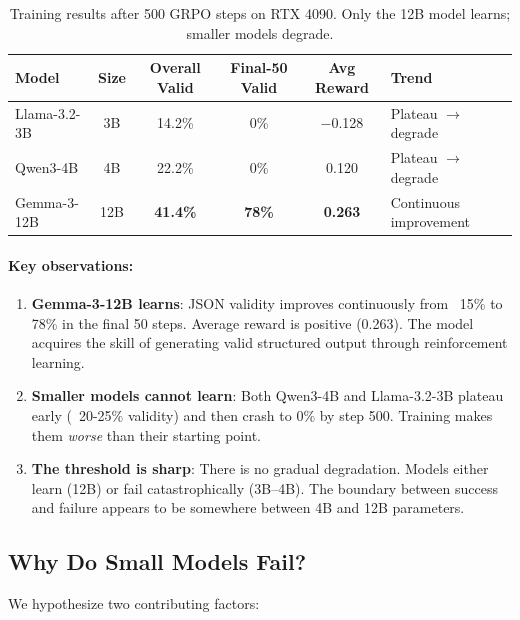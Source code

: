 \documentclass[11pt]{article}
\begin{document}
\begin{table}[t]
\centering
\caption{Training results after 500 GRPO steps on RTX 4090. Only the 12B model learns; smaller models degrade.}
\label{tab:training-results}
\begin{tabular}{lccccl}
\toprule
\textbf{Model} & \textbf{Size} & \textbf{Overall Valid} & \textbf{Final-50 Valid} & \textbf{Avg Reward} & \textbf{Trend} \\
\midrule
Llama-3.2-3B & 3B & 14.2\% & 0\% & $-$0.128 & Plateau $\rightarrow$ degrade \\
Qwen3-4B & 4B & 22.2\% & 0\% & 0.120 & Plateau $\rightarrow$ degrade \\
Gemma-3-12B & 12B & \textbf{41.4\%} & \textbf{78\%} & \textbf{0.263} & Continuous improvement \\
\bottomrule
\end{tabular}
\end{table}

\paragraph{Key observations:}

\begin{enumerate}[leftmargin=12pt]
    \item \textbf{Gemma-3-12B learns}: JSON validity improves continuously from ~15\% to 78\% in the final 50 steps. Average reward is positive (0.263). The model acquires the skill of generating valid structured output through reinforcement learning.

    \item \textbf{Smaller models cannot learn}: Both Qwen3-4B and Llama-3.2-3B plateau early (~20-25\% validity) and then crash to 0\% by step 500. Training makes them \emph{worse} than their starting point.

    \item \textbf{The threshold is sharp}: There is no gradual degradation. Models either learn (12B) or fail catastrophically (3B--4B). The boundary between success and failure appears to be somewhere between 4B and 12B parameters.
\end{enumerate}

\subsection{Why Do Small Models Fail?}

We hypothesize two contributing factors:
\end{document}
